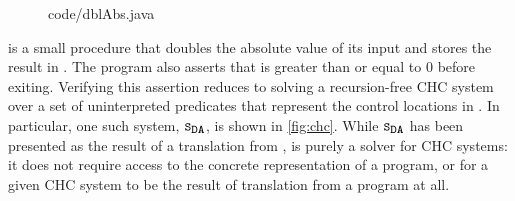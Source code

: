 \begin{figure}[t]
  \centering
  \begin{floatrow}[2]
    {
      
        {code/dblAbs.java}
    }
  \end{floatrow}
\end{figure}
%
 is a small procedure that doubles the absolute value of
its input and stores the result in .
The program also asserts that  is greater than or equal to $0$
before exiting.
Verifying this assertion reduces to solving a recursion-free
CHC system over a set of uninterpreted predicates that represent
the control locations in .
%
In particular, one such system, $\mcchc$, is shown in
\autoref{fig:chc}.
%
%
While $\mcchc$ has been presented as the result
of a translation from , \sys is
purely a solver for CHC systems: it does not require access to the
concrete representation of a program, or for a given CHC system to be
the result of translation from a program at all.

